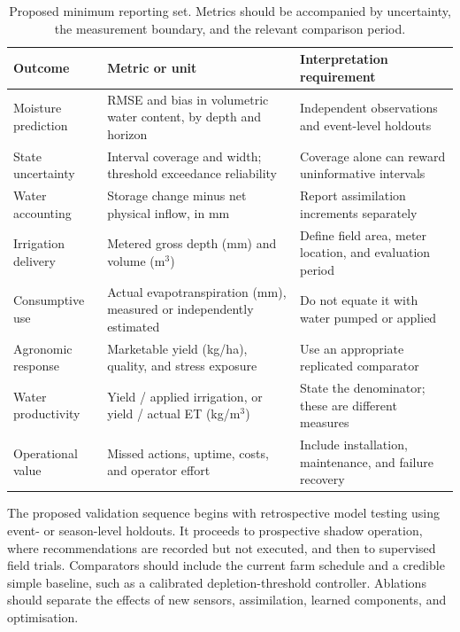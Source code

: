 \documentclass[11pt,a4paper]{article}
\begin{document}
\begin{table}[!htbp]
\centering
\small
\renewcommand{\arraystretch}{1.25}
\begin{tabular}{>{\raggedright\arraybackslash}p{}>{\raggedright\arraybackslash}p{}>{\raggedright\arraybackslash}p{}}
\toprule
\textbf{Outcome} & \textbf{Metric or unit} & \textbf{Interpretation requirement} \\
\midrule
Moisture prediction & RMSE and bias in volumetric water content, by depth and horizon & Independent observations and event-level holdouts \\[3pt]
State uncertainty & Interval coverage and width; threshold exceedance reliability & Coverage alone can reward uninformative intervals \\[3pt]
Water accounting & Storage change minus net physical inflow, in mm & Report assimilation increments separately \\[3pt]
Irrigation delivery & Metered gross depth (mm) and volume (m\ensuremath{^3}) & Define field area, meter location, and evaluation period \\[3pt]
Consumptive use & Actual evapotranspiration (mm), measured or independently estimated & Do not equate it with water pumped or applied \\[3pt]
Agronomic response & Marketable yield (kg/ha), quality, and stress exposure & Use an appropriate replicated comparator \\[3pt]
Water productivity & Yield / applied irrigation, or yield / actual ET (kg/m\ensuremath{^3}) & State the denominator; these are different measures \\[3pt]
Operational value & Missed actions, uptime, costs, and operator effort & Include installation, maintenance, and failure recovery \\[3pt]
\bottomrule
\end{tabular}
\caption{Proposed minimum reporting set. Metrics should be accompanied by uncertainty, the measurement boundary, and the relevant comparison period.}
\label{tab:2}
\end{table}

The proposed validation sequence begins with retrospective model testing using event- or season-level holdouts. It proceeds to prospective shadow operation, where recommendations are recorded but not executed, and then to supervised field trials. Comparators should include the current farm schedule and a credible simple baseline, such as a calibrated depletion-threshold controller. Ablations should separate the effects of new sensors, assimilation, learned components, and optimisation.
\end{document}
